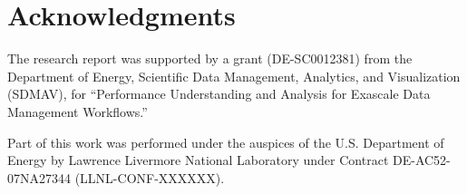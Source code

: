 \section{Acknowledgments}

The research report was supported by a grant (DE-SC0012381) from the
Department of Energy, Scientific Data Management, Analytics, and
Visualization (SDMAV), for ``Performance Understanding and Analysis
for Exascale Data Management Workflows.''

Part of this work was performed under the auspices of the
U.S. Department of Energy by Lawrence Livermore National Laboratory
under Contract DE-AC52-07NA27344 (LLNL-CONF-XXXXXX).




